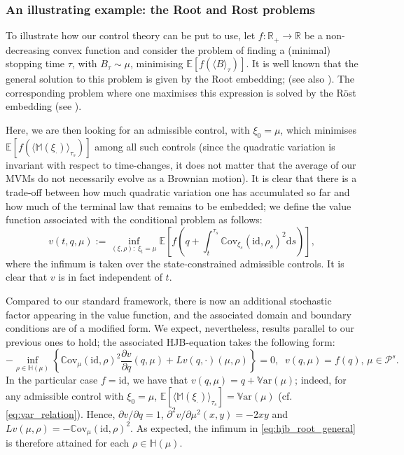 \documentclass{article}
\theoremstyle{definition}
\numberwithin{equation}{section}
\numberwithin{theorem}{section}
\newcommand{\E}{\mathbb{E}}
\newcommand{\pian}[2]{\dfrac{\partial #1}{\partial #2}}
\newcommand{\R}{\mathbb{R}}
\newcommand{\ds}{\mathrm{d}s}
\newcommand{\Hb}{\mathbb{H}}
\newcommand{\Mb}{\mathbb{M}}
\newcommand{\Pc}{\mathcal{P}}
\newcommand{\Cov}{\mathbb{C}\mathrm{ov}}
\newcommand{\Var}{\mathbb{V}\mathrm{ar}}
\begin{document}
	
	
	
	
	\subsubsection*{An illustrating example: the Root and Rost problems}
	
	To illustrate how our control theory can be put to use, let $f:\R_+\to\R$ be a non-decreasing convex function and consider the problem of finding a (minimal) stopping time $\tau$, with $B_\tau\sim\mu$, minimising $\E[f(\langle B\rangle_\tau)]$. 
	It is well known that the general solution to this problem is given by the Root embedding; \cite{root1969} (see also \cite{kiefer1972,rost1976}). The corresponding problem where one maximises this expression is solved by the R{\"o}st embedding (see \cite{obloj2004}).
	
	Here, we are then looking for an admissible control, with $\xi_0=\mu$, which minimises $\E[f(\langle\Mb(\xi_\cdot)\rangle_{\tau_s})]$ among all such controls (since the quadratic variation is invariant with respect to time-changes, it does not matter that the average of our MVMs do not necessarily evolve as a Brownian motion). 
	It is clear that there is a trade-off between how much quadratic variation one has accumulated so far and how much of the terminal law that remains to be embedded; we define the value function associated with the conditional problem as follows:
	\begin{equation*}
			v(t,q,\mu):=\inf_{(\xi,\rho):\;\xi_t=\mu} \E\left[f\left(q+\int_t^{\tau_s}\Cov_{\xi_s}(\mathrm{id},\rho_s)^2\ds\right)\right],
	\end{equation*}
	where the infimum is taken over the state-constrained admissible controls.
	It is clear that $v$ is in fact independent of $t$. 
	
		
	Compared to our standard framework, there is now an additional stochastic factor appearing in the value function, and the associated domain and boundary conditions are of a modified form. We expect, nevertheless, results parallel to our previous ones to hold; the associated HJB-equation takes the following form: 
	\begin{equation}\label{eq:hjb_root_general}
	-\inf_{\rho\in\Hb(\mu)}\left\{
	\Cov_{\mu}(\mathrm{id},\rho)^2\pian{v}{q}(q,\mu)+Lv(q,\cdot)(\mu,\rho)\right\}
	= 0,
	\;\;\textrm{$v(q,\mu)=f(q)$, $\mu\in\Pc^s$}.
  \end{equation}  
  In the particular case $f=\mathrm{id}$, we have that $v(q,\mu)=q+\Var(\mu)$; indeed, for any admissible control with $\xi_0=\mu$, $\E[\langle\Mb(\xi_\cdot)\rangle_{\tau_s}]=\Var(\mu)$ (cf. \eqref{eq:var_relation}). 
  Hence, $\partial v/\partial q=1$, $\partial^2v/\partial\mu^2(x,y)=-2xy$ and $Lv(\mu,\rho)=-\Cov_{\mu}(\mathrm{id},\rho)^2$. As expected, the infimum in \eqref{eq:hjb_root_general} is therefore attained for each $\rho\in\Hb(\mu)$.
  
\end{document}
